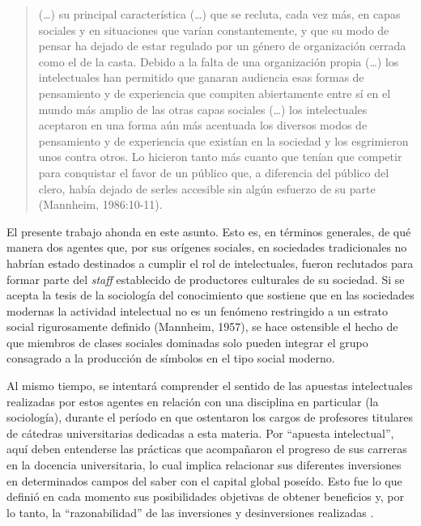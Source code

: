 \begin{quote}
(\dots) su principal característica (\dots) que se recluta, cada vez más, en capas sociales y en situaciones que varían constantemente, y que su modo de pensar ha dejado de estar regulado por un género de organización cerrada como el de la casta. Debido a la falta de una organización propia (\dots) los intelectuales han permitido que ganaran audiencia esas formas de pensamiento y de experiencia que compiten abiertamente entre sí en el mundo más amplio de las otras capas sociales (\dots) los intelectuales aceptaron en una forma aún más acentuada los diversos modos de pensamiento y de experiencia que existían en la sociedad y los esgrimieron unos contra otros. Lo hicieron tanto más cuanto que tenían que competir para conquistar el favor de un público que, a diferencia del público del clero, había dejado de serles accesible sin algún esfuerzo de su parte (Mannheim, 1986:10-11).
\end{quote}

El presente trabajo ahonda en este asunto. Esto es, en términos generales, de qué manera dos agentes que, por sus orígenes sociales, en sociedades tradicionales no habrían estado destinados a cumplir el rol de intelectuales, fueron reclutados para formar parte del \emph{staff} establecido de productores culturales de su sociedad. Si se acepta la tesis de la sociología del conocimiento que sostiene que en las sociedades modernas la actividad intelectual no es un fenómeno restringido a un estrato social rigurosamente definido \parencite{1513-SHILS1976,1521-BAUMAN1997,1576-BOURDIEU1999}(Mannheim, 1957), se hace ostensible el hecho de que miembros de clases sociales dominadas solo pueden integrar el grupo consagrado a la producción de símbolos en el tipo social moderno.

Al mismo tiempo, se intentará comprender el sentido de las apuestas intelectuales realizadas por estos agentes en relación con una disciplina en particular (la sociología), durante el período en que ostentaron los cargos de profesores titulares de cátedras universitarias dedicadas a esta materia. Por \enquote{apuesta intelectual}, aquí deben entenderse las prácticas que acompañaron el progreso de sus carreras en la docencia universitaria, lo cual implica relacionar sus diferentes inversiones en determinados campos del saber con el capital global poseído. Esto fue lo que definió en cada momento sus posibilidades objetivas de obtener beneficios y, por lo tanto, la \enquote{razonabilidad} de las inversiones y desinversiones realizadas \parencite{1576-BOURDIEU1999}.

